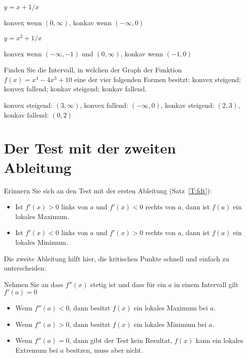 \begin{exercises}
\begin{exercise} $y = x+ 1/x$
\begin{answer} konvex wenn $(0,\infty)$, konkav wenn $(-\infty,0)$
\end{answer}\end{exercise}

\begin{exercise} $y = x^2+ 1/x$
\begin{answer} konvex wenn $(-\infty,-1)$ und $(0,\infty)$, konkav wenn $(-1,0)$
\end{answer}\end{exercise}

\endtwocol

\begin{exercise} Finden Sie die Intervall, in welchen der Graph der Funktion $f(x) = x^4-4x^3 +10$ eine der vier folgenden Formen besitzt:
  konvex steigend; konvex fallend; konkav steigend; konkav fallend.
\begin{answer} konvex steigend: $(3,\infty)$, konvex fallend: $(-\infty,0)$, konkav steigend: $(2,3)$,
konkav fallend: $(0,2)$
\end{answer}\end{exercise}


\end{exercises}








\section{Der Test mit der zweiten Ableitung}


Erinnern Sie sich an den Test mit der ersten Ableitung (Satz~\ref{T:fdt}):
\begin{itemize}
\item Ist $f'(x)>0$ links von $a$ und $f'(x)<0$ rechts von
  $a$, dann ist $f(a)$ ein lokales Maximum.
\item Ist $f'(x)<0$ links von $a$ und $f'(x)>0$ rechts von
  $a$, dann ist $f(a)$ ein lokales Minimum.
\end{itemize}

Die zweite Ableitung hilft hier, die kritischen Punkte schnell und einfach zu unterscheiden:

\begin{mainTheorem}\label{T:sdt}
Nehmen Sie an dass $f''(x)$ stetig ist und dass für ein $a$ in einem Intervall gilt $f'(a)=0$
\begin{itemize}
\item Wenn $f''(a) <0$, dann besitzt $f(x)$ ein lokales Maximum bei $a$.
\item Wenn $f''(a) >0$, dann besitzt $f(x)$ ein lokales Minimum bei $a$.
\item Wenn $f''(a) =0$, dann gibt der Test kein Resultat, $f(x)$ kann ein lokales Extremum bei $a$ besitzen, muss aber nicht.
\end{itemize}
\end{mainTheorem}


